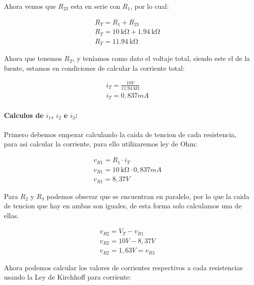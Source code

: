 \documentclass[a4paper,12pt]{article}
\begin{document}
Ahora vemos que $R_{23}$ esta en serie con $R_1$, por lo cual:

\begin{align*}
    R_T = R_1 + R_{23} \\[0.5cm]
    R_T = \SI{10}{\kilo\ohm} + \SI{1.94}{\kilo\ohm} \\[0.5cm]
    R_T = \SI{11.94}{\kilo\ohm}
\end{align*}

Ahora que tenemos $R_T$, y teníamos como dato el voltaje total, siendo este el de la fuente, estamos en condiciones de calcular la corriente total:

\begin{align*}
    i_T = \frac{10V}{\SI{11.94}{\kilo\ohm}}\\[0.5cm]
    i_T =  0,837mA 
\end{align*}

\paragraph{Calculos de $i_1$, $i_2$ e $i_3$:}
\paragraph{}
\vspace{0.5cm}

Primero debemos empezar calculando la caida de tencion de cada resistencia, para asi calcular la corriente, para ello utilizaremos ley de Ohm:

\begin{align*}
    v_{R1} = R_1 \cdot i_T \\[0.5cm]
    v_{R1} = \SI{10}{\kilo\ohm} \cdot 0,837mA\\[0.5cm]
    v_{R1} = 8,37 V
\end{align*}

Para $R_2$ y $R_3$ podemos obsevar que se encuentran en paralelo, por lo que la caida de tencion que hay en ambas son iguales, de esta forma solo calculamos una de ellas.

\begin{align*}
    v_{R2} = V_T - v_{R1}\\[0.5cm]
    v_{R2} = 10V - 8,37V\\[0.5cm]
    v_{R2} = 1,63V = v_{R3}
\end{align*}

\vspace{0.5cm}

Ahora podemos calcular los valores de corrientes respectivos a cada resistencias usando la Ley de Kirchhoff para corriente:\\
\end{document}
